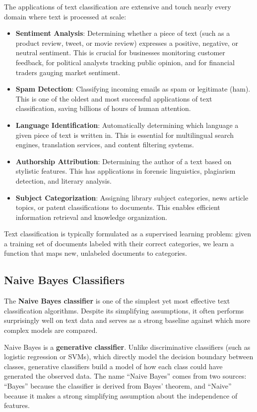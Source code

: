 \documentclass[11pt,a4paper]{article}
\begin{document}
The applications of text classification are extensive and touch nearly every domain where text is processed at scale:
\begin{itemize}
    \item \textbf{Sentiment Analysis}: Determining whether a piece of text (such as a product review, tweet, or movie review) expresses a positive, negative, or neutral sentiment. This is crucial for businesses monitoring customer feedback, for political analysts tracking public opinion, and for financial traders gauging market sentiment.
    \item \textbf{Spam Detection}: Classifying incoming emails as spam or legitimate (ham). This is one of the oldest and most successful applications of text classification, saving billions of hours of human attention.
    \item \textbf{Language Identification}: Automatically determining which language a given piece of text is written in. This is essential for multilingual search engines, translation services, and content filtering systems.
    \item \textbf{Authorship Attribution}: Determining the author of a text based on stylistic features. This has applications in forensic linguistics, plagiarism detection, and literary analysis.
    \item \textbf{Subject Categorization}: Assigning library subject categories, news article topics, or patent classifications to documents. This enables efficient information retrieval and knowledge organization.
\end{itemize}

Text classification is typically formulated as a supervised learning problem: given a training set of documents labeled with their correct categories, we learn a function that maps new, unlabeled documents to categories.

\subsection{Naive Bayes Classifiers}

The \textbf{Naive Bayes classifier} is one of the simplest yet most effective text classification algorithms. Despite its simplifying assumptions, it often performs surprisingly well on text data and serves as a strong baseline against which more complex models are compared.

Naive Bayes is a \textbf{generative classifier}. Unlike discriminative classifiers (such as logistic regression or SVMs), which directly model the decision boundary between classes, generative classifiers build a model of how each class could have generated the observed data. The name ``Naive Bayes'' comes from two sources: ``Bayes'' because the classifier is derived from Bayes' theorem, and ``Naive'' because it makes a strong simplifying assumption about the independence of features.
\end{document}
